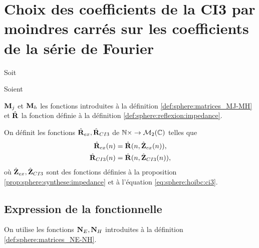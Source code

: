 \section[Choix 2 du calcul des coefficients de la CI3]{Choix des coefficients de la CI3 par moindres carrés sur les coefficients de la série de Fourier}

  Soit
\begin{REM}
  Soient
\end{REM} 
  \(\mathbf{M}_j\) et \(\mathbf{M}_h\) les fonctions introduites à la définition \ref{def:sphere:matrices_MJ-MH} et \(\hat{\mathbf{R}}\) la fonction définie à la définition \ref{def:sphere:reflexion:impedance}.

  \begin{defn}%
    \label{def:sphere:minimisation:matrices_MR}
    On définit les fonctions \(\hat{\mathbf{R}}_{ex}, \hat{\mathbf{R}}_{CI3}\) de \(\mathbb N\times \rightarrow \mathcal{M}_2(\mathbb C)\) telles que
    \begin{align*}
      \hat{\mathbf{R}}_{ex}(n) &= \hat{\mathbf{R}}(n, \hat{\mathbf{Z}}_{ex}(n)),
      \\
      \hat{\mathbf{R}}_{CI3}(n) &= \hat{\mathbf{R}}(n, \hat{\mathbf{Z}}_{CI3}(n)),
    \end{align*}
    où \(\hat{\mathbf{Z}}_{ex},\hat{\mathbf{Z}}_{CI3}\) sont des fonctions définies à la proposition \ref{prop:sphere:synthese:impedance} et à l'équation \eqref{eq:sphere:hoibc:ci3}.
  \end{defn}

  \subsection{Expression de la fonctionnelle}

    On utilise les fonctions \(\mathbf{N}_E, \mathbf{N}_H\) introduites à la définition \ref{def:sphere:matrices_NE-NH}.

